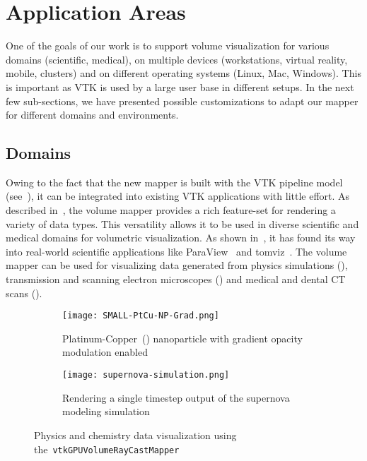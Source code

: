 \section{Application Areas}
\label{applicationareas}

One of the goals of our work is to support volume visualization for various
domains (scientific, medical), on multiple devices (workstations, virtual
reality, mobile, clusters) and on different operating systems (Linux, Mac,
Windows). This is important as VTK is used by a large user base in different
setups.  In the next few sub-sections, we have presented possible customizations to adapt our
mapper for different domains and environments.

\subsection{Domains}
\label{domains}

Owing to the fact that the new mapper is built with the VTK pipeline model
(see~), it can be integrated into existing VTK
applications with little effort. As described
in~, the volume mapper provides a rich
feature-set for rendering a variety of data types. This versatility allows it
to be used in diverse scientific and medical domains for volumetric
visualization. As shown in~, it has found
its way into real-world scientific applications like
ParaView~\citep{ahrens_paraview:_2005, ayachit_paraview_2015,
ayachit_paraview_2015-1} and tomviz~\citep{hanwell_tomviz_2014}. The volume
mapper can be used for visualizing data generated from physics simulations
(), transmission and scanning electron
microscopes () and medical and dental CT scans
(). 

\begin{figure}[htb]
  \begin{subfigure}[t]{0.49\columnwidth}
    \texttt{[image: SMALL-PtCu-NP-Grad.png]}
    \caption{Platinum-Copper~()
      nanoparticle \protect\citep{scott_electron_2012, miao_atomic_2016} with
      gradient opacity modulation enabled}
    \label{fig:ptcu-grad}
  \end{subfigure}\hfill%
  \begin{subfigure}[t]{0.49\columnwidth}
    \texttt{[image: supernova-simulation.png]}
    \caption{Rendering a single timestep output of the supernova modeling
      simulation~\protect\citep{blondin_pulsar_2007}}
    \label{fig:supernova}
  \end{subfigure}
  \caption{Physics and chemistry data visualization using
    the~\texttt{vtkGPUVolumeRayCastMapper}}
  \label{fig:domains}
\end{figure}

